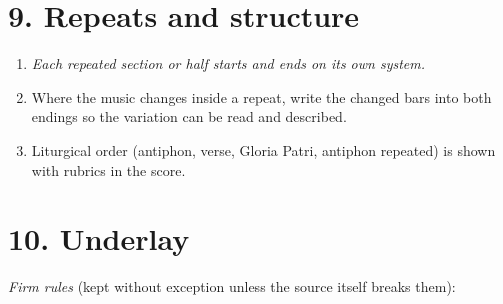 \section*{9. Repeats and structure}

\begin{enumerate}

\tightlist
\item
  \textit{Each repeated section or half starts and ends on its own system.}
\item
  Where the music changes inside a repeat, write the changed bars into both endings so the variation can be read and described.
\item
  Liturgical order (antiphon, verse, Gloria Patri, antiphon repeated) is shown with rubrics in the score.
\end{enumerate}

\section*{10. Underlay}

\textit{Firm rules} (kept without exception unless the source itself breaks them):

